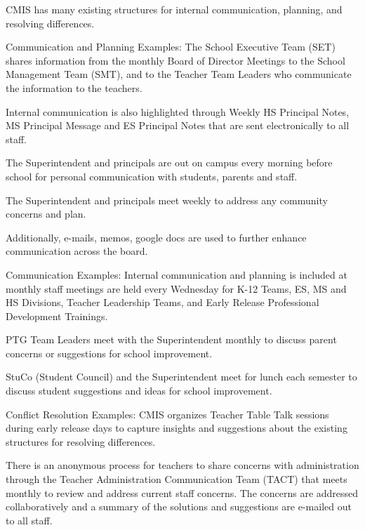 

\begin{findings}

CMIS has many existing structures for internal communication, planning, and resolving differences.

Communication and Planning Examples:
The School Executive Team (SET) shares information from the monthly Board of Director Meetings to the School Management Team (SMT), and to the Teacher Team Leaders who communicate the information to the teachers.

Internal communication is also highlighted through Weekly HS Principal Notes, MS Principal Message and ES Principal Notes that are sent electronically to all staff.

The Superintendent and principals are out on campus every morning before school for personal communication with students, parents and staff.

The Superintendent and principals meet weekly to address any community concerns and plan.

Additionally, e-mails, memos, google docs are used to further enhance communication across the board.

Communication Examples:
Internal communication and planning is included at monthly staff meetings are held every Wednesday for K-12 Teams, ES, MS and HS Divisions, Teacher Leadership Teams, and Early Release Professional Development Trainings.

PTG Team Leaders meet with the Superintendent monthly to discuss parent concerns or suggestions for school improvement.

StuCo (Student Council) and the Superintendent meet for lunch each semester to discuss student suggestions and ideas for school improvement.

Conflict Resolution Examples:
CMIS organizes Teacher Table Talk sessions during early release days to capture insights and suggestions about the existing structures for resolving differences.

There is an anonymous process for teachers to share concerns with administration through the Teacher Administration Communication Team (TACT) that meets monthly to review and address current staff concerns. The concerns are addressed collaboratively and a summary of the solutions and suggestions are e-mailed out to all staff.


\end{findings}
